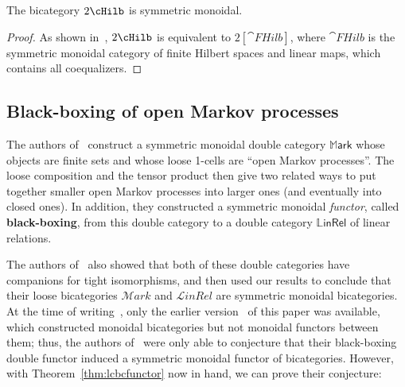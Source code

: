 \begin{cor}
The bicategory $2\cHilb$ is symmetric monoidal.
\end{cor}

\begin{proof}
As shown in~\cite[Section 3.6.3]{westerthesis}, $2\cHilb$ is equivalent to $2[\cat{FHilb}]$, where $\cat{FHilb}$ is the symmetric monoidal category of finite Hilbert spaces and linear maps, which contains all coequalizers.
\end{proof}

\subsection{Black-boxing of open Markov processes}
\label{sec:markov}

The authors of~\cite{bc:markov} construct a symmetric monoidal double category $\mathbb{M}\mathsf{ark}$ whose objects are finite sets and whose loose 1-cells are ``open Markov processes''.
The loose composition and the tensor product then give two related ways to put together smaller open Markov processes into larger ones (and eventually into closed ones).
In addition, they constructed a symmetric monoidal \emph{functor}, called \textbf{black-boxing}, from this double category to a double category $\mathbb{L}\mathsf{inRel}$ of linear relations.

The authors of~\cite{bc:markov} also showed that both of these double categories have companions for tight isomorphisms, and then used our results to conclude that their loose bicategories $\mathcal{M}\mathit{ark}$ and $\mathcal{L}\mathit{inRel}$ are symmetric monoidal bicategories.
At the time of writing~\cite{bc:markov}, only the earlier version~\cite{shulman:smbicat} of this paper was available, which constructed monoidal bicategories but not monoidal functors between them; thus, the authors of~\cite{bc:markov} were only able to conjecture that their black-boxing double functor induced a symmetric monoidal functor of bicategories.
However, with Theorem~\ref{thm:lcbcfunctor} now in hand, we can prove their conjecture:

